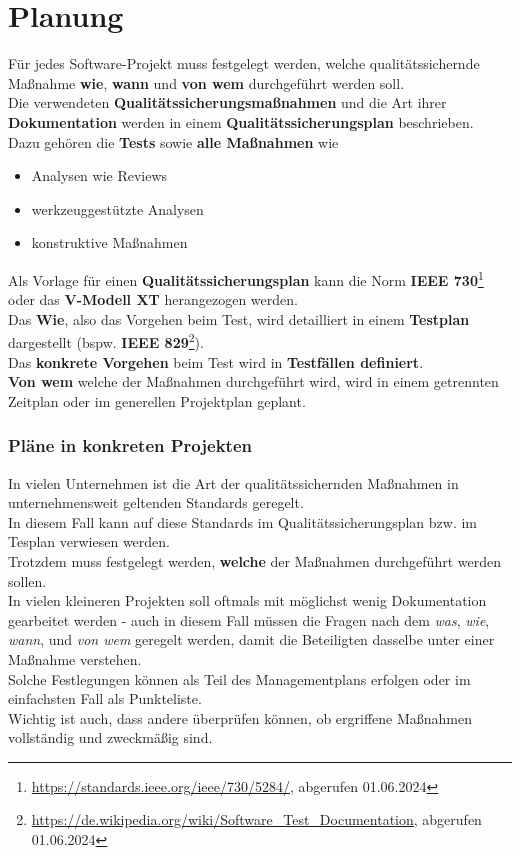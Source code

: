 \section{Planung}
Für jedes Software-Projekt muss festgelegt werden, welche qualitätssichernde Maßnahme \textbf{wie}, \textbf{wann} und \textbf{von wem} durchgeführt werden soll.\\

\noindent
Die verwendeten \textbf{Qualitätssicherungsmaßnahmen} und die Art ihrer \textbf{Dokumentation} werden in einem \textbf{Qualitätssicherungsplan} beschrieben.\\
Dazu gehören die \textbf{Tests} sowie \textbf{alle Maßnahmen} wie

\begin{itemize}
    \item Analysen wie Reviews
    \item werkzeuggestützte Analysen
    \item konstruktive Maßnahmen
\end{itemize}

\noindent
Als Vorlage für einen \textbf{Qualitätssicherungsplan} kann die  Norm \textbf{IEEE 730}\footnote{
\url{https://standards.ieee.org/ieee/730/5284/}, abgerufen 01.06.2024
} oder das \textbf{V-Modell XT} herangezogen werden.\\
Das \textbf{Wie}, also das Vorgehen beim Test, wird detailliert in einem \textbf{Testplan} dargestellt (bspw. \textbf{IEEE 829}\footnote{
\url{https://de.wikipedia.org/wiki/Software_Test_Documentation}, abgerufen 01.06.2024
}).\\
Das \textbf{konkrete Vorgehen} beim Test wird in \textbf{Testfällen definiert}.\\
\textbf{Von wem} welche der Maßnahmen durchgeführt wird, wird in einem getrennten Zeitplan oder im generellen Projektplan  geplant.

\subsubsection*{Pläne in konkreten Projekten}
In vielen Unternehmen ist die Art der qualitätssichernden Maßnahmen in unternehmensweit geltenden Standards geregelt.\\
In diesem Fall kann auf diese Standards im Qualitätssicherungsplan bzw. im Tesplan verwiesen werden.\\
Trotzdem muss festgelegt werden, \textbf{welche} der Maßnahmen durchgeführt werden sollen.\\
In vielen kleineren Projekten soll oftmals mit möglichst wenig Dokumentation gearbeitet werden - auch in diesem Fall müssen die Fragen nach dem \textit{was}, \textit{wie}, \textit{wann}, und \textit{von wem} geregelt werden, damit die Beteiligten dasselbe unter einer Maßnahme verstehen.\\
Solche Festlegungen können als Teil des Managementplans erfolgen oder im einfachsten Fall als Punkteliste.\\
Wichtig ist auch, dass andere überprüfen können, ob ergriffene Maßnahmen vollständig und zweckmäßig sind.